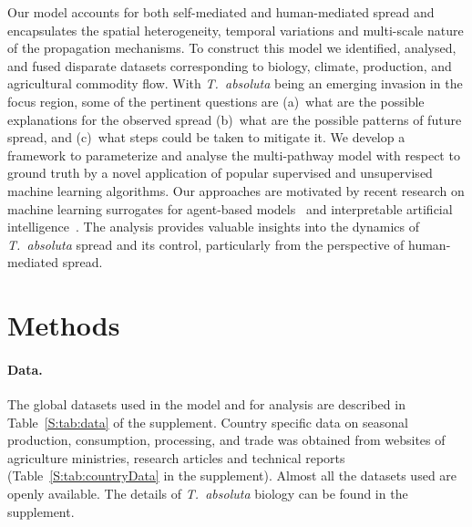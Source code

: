 \documentclass[11pt]{article}
\newcommand{\tuta}{\emph{T.~absoluta}}
\theoremstyle{definition}
\begin{document}
Our model accounts for both self-mediated and human-mediated spread and
encapsulates the spatial heterogeneity, temporal variations and
multi-scale nature of the propagation mechanisms. To construct this model we
identified, analysed, and fused disparate datasets corresponding to
biology, climate, production, and agricultural commodity flow. With \tuta{}
being an emerging invasion in the focus region, some of the pertinent
questions are (a)~what are the possible explanations for the observed
spread (b)~what are the possible patterns of future spread, and (c)~what
steps could be taken to mitigate it. We develop a framework to parameterize
and analyse the multi-pathway model with respect to ground truth by a novel
application of popular supervised and unsupervised machine learning
algorithms. Our approaches are motivated by recent research on machine
learning surrogates for agent-based models~\cite{lamperti2018agent} and
interpretable artificial intelligence~\cite{guidotti2019survey}. The
analysis provides valuable insights into the dynamics of \tuta{} spread and
its control, particularly from the perspective of human-mediated spread.


\section{Methods}
\paragraph{Data.} The global datasets used in the model and for analysis
are described in Table~\ref{S:tab:data} of the supplement. Country specific
data on seasonal production, consumption, processing, and trade was obtained
from websites of agriculture ministries, research articles and technical
reports (Table~\ref{S:tab:countryData} in the supplement). Almost all the
datasets used are openly available. The details of \tuta{} biology can be
found in the supplement. 
\end{document}
